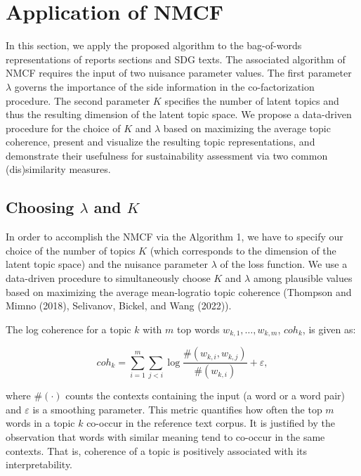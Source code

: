 \documentclass[
]{article}
\begin{document}
\hypertarget{application-of-nmcf}{%
\section{Application of NMCF}\label{application-of-nmcf}}

In this section, we apply the proposed algorithm to the bag-of-words representations of reports sections and SDG texts. The associated algorithm of NMCF requires the input of two nuisance parameter values. The first parameter \(\lambda\) governs the importance of the side information in the co-factorization procedure. The second parameter \(K\) specifies the number of latent topics and thus the resulting dimension of the latent topic space. We propose a data-driven procedure for the choice of \(K\) and \(\lambda\) based on maximizing the average topic coherence, present and visualize the resulting topic representations, and demonstrate their usefulness for sustainability assessment via two common (dis)similarity measures.

\hypertarget{choosing-lambda-and-k}{%
\subsection{\texorpdfstring{Choosing \(\lambda\) and \(K\)}{Choosing \textbackslash lambda and K}}\label{choosing-lambda-and-k}}

In order to accomplish the NMCF via the Algorithm 1, we have to specify our choice of the number of topics \(K\) (which corresponds to the dimension of the latent topic space) and the nuisance parameter \(\lambda\) of the loss function. We use a data-driven procedure to simultaneously choose \(K\) and \(\lambda\) among plausible values based on maximizing the average mean-logratio topic coherence (Thompson and Mimno (2018), Selivanov, Bickel, and Wang (2022)).

The log coherence for a topic \(k\) with \(m\) top words \(w_{k,1},\ldots, w_{k,m}\), \(coh_k\), is given as:

\begin{equation}
coh_{k}=\sum_{i=1}^m\sum_{j<i}\log\frac{\#(w_{k,i},w_{k,j})}{\#(w_{k,i})}+\varepsilon,\label{eq:coh}
\end{equation}

where \(\#(\cdot)\) counts the contexts containing the input (a word or a word pair) and \(\varepsilon\) is a smoothing parameter. This metric quantifies how often the top \(m\) words in a topic \(k\) co-occur in the reference text corpus. It is justified by the observation that words with similar meaning tend to co-occur in the same contexts. That is, coherence of a topic is positively associated with its interpretability.
\end{document}
